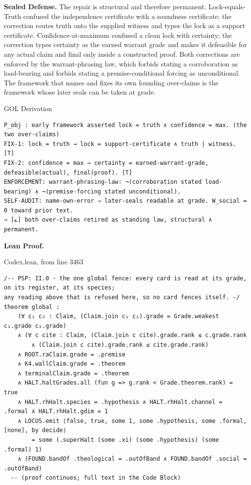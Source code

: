 \documentclass[10pt,twocolumn]{article}
\begin{document}
\textbf{Sealed Defense.} The repair is structural and therefore
permanent. Lock-equals-Truth confused the independence certificate with
a soundness certificate; the correction routes truth onto the supplied
witness and types the lock as a support certificate.
Confidence-at-maximum confused a clean lock with certainty; the
correction types certainty as the earned warrant grade and makes it
defeasible for any actual claim and final only inside a constructed
proof. Both corrections are enforced by the warrant-phrasing law, which
forbids stating a corroboration as load-bearing and forbids stating a
premise-conditional forcing as unconditional. The framework that names
and fixes its own founding over-claims is the framework whose later
seals can be taken at grade.

\begin{golbox}{GOL Derivation}
\begin{lstlisting}[style=golv]
P_obj : early framework asserted lock = truth ∧ confidence = max. (the two over-claims)
FIX-1: lock = truth → lock = support-certificate ∧ truth | witness. [T]
FIX-2: confidence = max → certainty = earned-warrant-grade, defeasible(actual), final(proof). [T]
ENFORCEMENT: warrant-phrasing-law: ¬(corroboration stated load-bearing) ∧ ¬(premise-forcing stated unconditional).
SELF-AUDIT: name-own-error ⇒ later-seals readable at grade. W_social = 0 toward prior text.
⇒ [⟀] both over-claims retired as standing law, structural ∧ permanent.
\end{lstlisting}
\end{golbox}

\textbf{Lean Proof.}

\begin{leanexcerpt}{Codex.lean, from line 3463}
\begin{lstlisting}[style=leanx,firstnumber=3463]
/-- PSP: II.0 · the one global fence: every card is read at its grade, on its register, at its species;
any reading above that is refused here, so no card fences itself. -/
theorem global :
    (∀ c₁ c₂ : Claim, (Claim.join c₁ c₂).grade = Grade.weakest c₁.grade c₂.grade)
    ∧ (∀ c cite : Claim, (Claim.join c cite).grade.rank ≤ c.grade.rank
        ∧ (Claim.join c cite).grade.rank ≤ cite.grade.rank)
    ∧ ROOT.raClaim.grade = .premise
    ∧ K4.wallClaim.grade = .theorem
    ∧ terminalClaim.grade = .theorem
    ∧ HALT.haltGrades.all (fun g => g.rank < Grade.theorem.rank) = true
    ∧ HALT.rhHalt.species = .hypothesis ∧ HALT.rhHalt.channel = .formal ∧ HALT.rhHalt.gdim = 1
    ∧ LOCUS.emit ⟨false, true, some 1, some .hypothesis, some .formal, [none], by decide⟩
        = some (.superHalt (some .xi) (some .hypothesis) (some .formal) 1)
    ∧ (FOUND.bandOf .theological = .outOfBand ∧ FOUND.bandOf .social = .outOfBand)
  -- (proof continues; full text in the Code Block)
\end{lstlisting}
\end{leanexcerpt}
\end{document}
